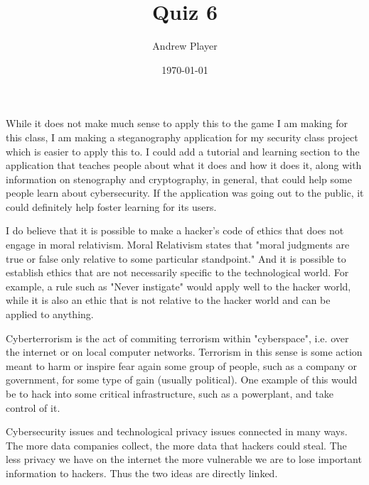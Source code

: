 \documentclass[12pt]{article}
\title{Quiz 6}
\author{Andrew Player}
\date{\today}
\makeatletter
\theoremstyle{homework}
\newenvironment{exercise}[1]
{\def\@currentlabel{#1}\exercisecore}
{\endexercisecore}
\makeatother
\begin{document}
\maketitle

\begin{exercise}{Question \# 1}
\end{exercise}
\noindent
While it does not make much sense to apply this to the game I am making for this class, I am
making a steganography application for my security class project which is easier to apply this to.
I could add a tutorial and learning section to the application that teaches people about what it does
and how it does it, along with information on stenography and cryptography, in general, that could
help some people learn about cybersecurity. If the application was going out to the public, it could
definitely help foster learning for its users.


\begin{exercise}{Question \# 2}
\end{exercise}
\noindent
I do believe that it is possible to make a hacker's code of ethics that does not engage in 
moral relativism. Moral Relativism states that "moral judgments are true or false only relative
to some particular standpoint." And it is possible to establish ethics that are not necessarily
specific to the technological world. For example, a rule such as "Never instigate" would apply well 
to the hacker world, while it is also an ethic that is not relative to the hacker world and can be 
applied to anything.

\begin{exercise}{Question \# 3}
\end{exercise}
\noindent
Cyberterrorism is the act of commiting terrorism within "cyberspace", i.e. over the internet
or on local computer networks. Terrorism in this sense is some action meant to harm or inspire
fear again some group of people, such as a company or government, for some type of gain (usually political). 
One example of this would be to hack into some critical infrastructure, such as a powerplant, and take 
control of it. 
\newline 
 

\newpage
\begin{exercise}{Question \# 4}
\end{exercise}
\noindent
Cybersecurity issues and technological privacy issues connected in many ways. The more data
companies collect, the more data that hackers could steal. The less privacy we have on the internet
the more vulnerable we are to lose important information to hackers. Thus the two ideas are directly linked.
\end{document}
